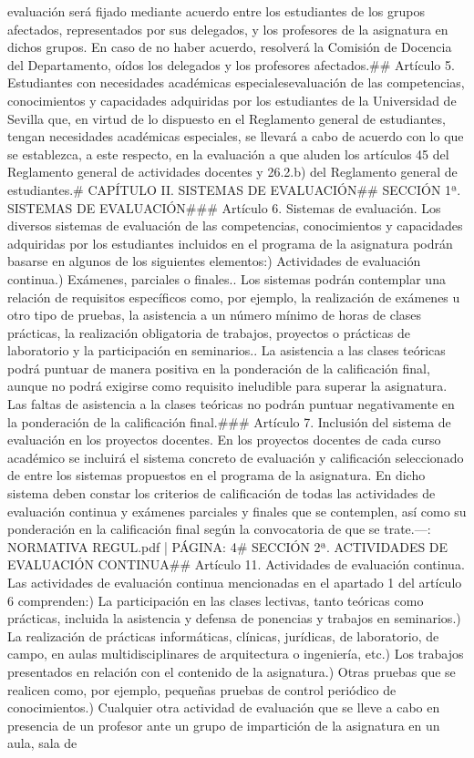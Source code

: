 \documentclass{article}
\begin{document}
\begin{itemize}
{{{{evaluación será fijado mediante acuerdo entre los estudiantes de los grupos afectados, representados por sus delegados, y los profesores de la asignatura en dichos grupos. En caso de no haber acuerdo, resolverá la Comisión de Docencia del Departamento, oídos los delegados y los profesores afectados.\n\n## Artículo 5. Estudiantes con necesidades académicas especiales\n\nLa evaluación de las competencias, conocimientos y capacidades adquiridas por los estudiantes de la Universidad de Sevilla que, en virtud de lo dispuesto en el Reglamento general de estudiantes, tengan necesidades académicas especiales, se llevará a cabo de acuerdo con lo que se establezca, a este respecto, en la evaluación a que aluden los artículos 45 del Reglamento general de actividades docentes y 26.2.b) del Reglamento general de estudiantes.\n\n# CAPÍTULO II. SISTEMAS DE EVALUACIÓN\n\n## SECCIÓN 1ª. SISTEMAS DE EVALUACIÓN\n\n### Artículo 6. Sistemas de evaluación\n{}. Los diversos sistemas de evaluación de las competencias, conocimientos y capacidades adquiridas por los estudiantes incluidos en el programa de la asignatura podrán basarse en algunos de los siguientes elementos:\na) Actividades de evaluación continua.\nb) Exámenes, parciales o finales.\n{}. Los sistemas podrán contemplar una relación de requisitos específicos como, por ejemplo, la realización de exámenes u otro tipo de pruebas, la asistencia a un número mínimo de horas de clases prácticas, la realización obligatoria de trabajos, proyectos o prácticas de laboratorio y la participación en seminarios.\n{}. La asistencia a las clases teóricas podrá puntuar de manera positiva en la ponderación de la calificación final, aunque no podrá exigirse como requisito ineludible para superar la asignatura. Las faltas de asistencia a la clases teóricas no podrán puntuar negativamente en la ponderación de la calificación final.\n\n### Artículo 7. Inclusión del sistema de evaluación en los proyectos docentes\n{}. En los proyectos docentes de cada curso académico se incluirá el sistema concreto de evaluación y calificación seleccionado de entre los sistemas propuestos en el programa de la asignatura. En dicho sistema deben constar los criterios de calificación de todas las actividades de evaluación continua y exámenes parciales y finales que se contemplen, así como su ponderación en la calificación final según la convocatoria de que se trate.\n\n---\n\nFUENTE: NORMATIVA REGUL.pdf | PÁGINA: 4\n# SECCIÓN 2ª. ACTIVIDADES DE EVALUACIÓN CONTINUA\n\n## Artículo 11. Actividades de evaluación continua\n{}. Las actividades de evaluación continua mencionadas en el apartado 1 del artículo 6 comprenden:\na) La participación en las clases lectivas, tanto teóricas como prácticas, incluida la asistencia y defensa de ponencias y trabajos en seminarios.\nb) La realización de prácticas informáticas, clínicas, jurídicas, de laboratorio, de campo, en aulas multidisciplinares de arquitectura o ingeniería, etc.\nc) Los trabajos presentados en relación con el contenido de la asignatura.\nd) Otras pruebas que se realicen como, por ejemplo, pequeñas pruebas de control periódico de conocimientos.\ne) Cualquier otra actividad de evaluación que se lleve a cabo en presencia de un profesor ante un grupo de impartición de la asignatura en un aula, sala de }}}}
\end{itemize}
\end{document}
